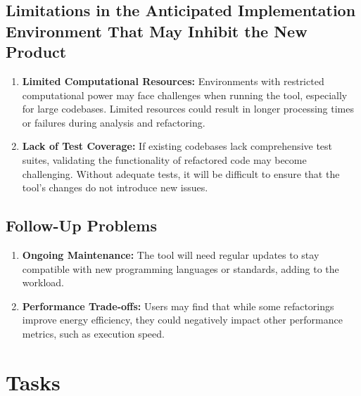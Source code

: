 \documentclass[12pt]{article}
\begin{document}
\subsection{Limitations in the Anticipated Implementation Environment That May
Inhibit the New Product}
\begin{enumerate}
  \item \textbf{Limited Computational Resources:} Environments with restricted computational power may face challenges when running the tool, especially for large codebases. Limited resources could result in longer processing times or failures during analysis and refactoring.
  \item \textbf{Lack of Test Coverage:} If existing codebases lack comprehensive test suites, validating the functionality of refactored code may become challenging. Without adequate tests, it will be difficult to ensure that the tool's changes do not introduce new issues.
\end{enumerate}
\subsection{Follow-Up Problems}
\begin{enumerate}
  \item \textbf{Ongoing Maintenance:} The tool will need regular updates to stay compatible with new programming languages or standards, adding to the workload.
  \item \textbf{Performance Trade-offs:} Users may find that while some refactorings improve energy efficiency, they could negatively impact other performance metrics, such as execution speed.
\end{enumerate}
\section{Tasks}
\end{document}
